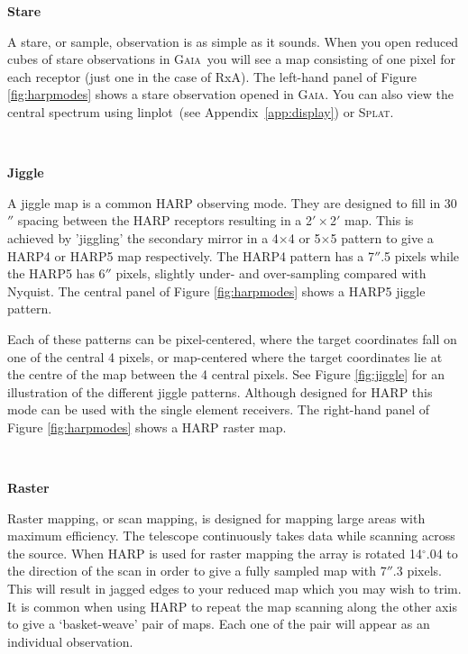 \documentclass[twoside,11pt]{article}
\newcommand{\htmlref}[2]{#1}
\newcommand{\latexhtml}[2]{#1}
\newcommand{\xref}[3]{#1}
\renewcommand{\_}{\texttt{\symbol{95}}}
\newcommand{\gaia}{\xref{\textsc{Gaia}}{sun214}{}}
\newcommand{\splat}{\xref{\textsc{Splat}}{sun243}{}}
\newcommand{\task}[1]{\textsf{#1}}
\newcommand{\linplot}{\xref{\task{linplot}}{sun95}{LINPLOT}}
\newcommand{\cref}[3]{\latexhtml{#1~\ref{#2}}{\htmlref{#3}{#2}}}
\begin{document}
\begin{minipage}[t]{0.14\linewidth}
\textbf{Stare}
\end{minipage}
\begin{minipage}[t]{0.85\linewidth}
A stare, or sample, observation is as simple as it sounds. When you open reduced cubes of stare observations in \gaia\ you will see a map consisting of one pixel for each receptor (just one in the case of RxA). The left-hand panel of Figure \ref{fig:harpmodes} shows a stare observation opened in \gaia. You can also view the central spectrum using \linplot\ (see \cref{Appendix}{app:display}{Viewing your data with KAPPA}) or \splat.
\end{minipage}
\vspace{0.7cm}\\
\begin{minipage}[t]{0.14\linewidth}
\textbf{Jiggle}
\end{minipage}
\begin{minipage}[t]{0.85\linewidth}
A jiggle map is a common HARP observing mode. They are designed to fill in 30$''$ spacing between the HARP receptors resulting in a 2$'\times$2$'$ map. This is achieved by 'jiggling' the secondary mirror in a 4$\times$4 or 5$\times$5 pattern to give a HARP4 or HARP5 map respectively.   The HARP4 pattern has a 7$''$.5 pixels while the HARP5 has 6$''$ pixels, slightly under- and over-sampling compared with Nyquist. The central panel of Figure \ref{fig:harpmodes} shows a HARP5 jiggle pattern.

Each of these patterns can be pixel-centered, where the target coordinates fall on one of the central 4 pixels, or map-centered where the target coordinates lie at the centre of the map between the 4 central pixels. See Figure \ref{fig:jiggle} for an illustration of the different jiggle patterns. Although designed for HARP this mode can be used with the single element receivers. The right-hand panel of Figure \ref{fig:harpmodes} shows a HARP raster map.
\end{minipage}
\vspace{0.7cm}\\
\begin{minipage}[t]{0.14\linewidth}
\textbf{Raster}
\end{minipage}
\begin{minipage}[t]{0.85\linewidth}
Raster mapping, or scan mapping, is designed for mapping large areas with maximum efficiency. The telescope continuously takes data while scanning across the source. When HARP is used for raster mapping the array is rotated 14$^\circ$.04 to the direction of the scan in order to give a fully sampled map with 7$''$.3 pixels. This will result in jagged edges to your reduced map which you may wish to trim. It is common when using HARP to repeat the map scanning along the other axis to give a `basket-weave'  pair of maps. Each one of the pair will appear as an individual observation.
\end{minipage}
\end{document}
